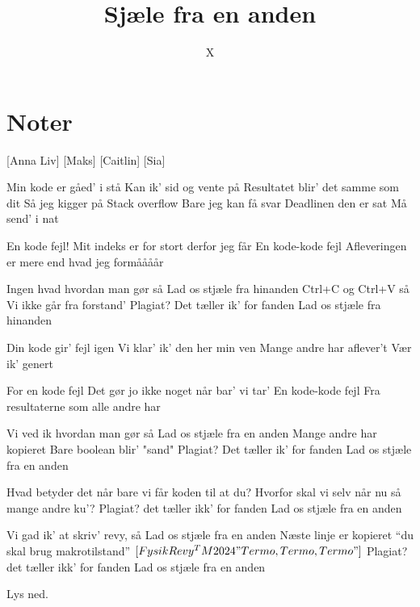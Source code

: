 \documentclass{article}
\title{Sjæle fra en anden}
\author{X}
\begin{document}
                
\maketitle
\section*{Noter}                %
\begin{roles}
[Anna Liv]
[Maks]
[Caitlin]
 [Sia]
\end{roles}

\begin{props}

\prop{} 
\end{props}

\newpage%
\begin{song}

 Min kode er gåed' i stå 
 Kan ik' sid og vente på 
 Resultatet blir' det samme som dit 
 Så jeg kigger på 
 Stack overflow 
 Bare jeg kan få svar 
 Deadlinen den er sat 
Må send' i nat 

 En kode fejl! 
 Mit indeks er for stort derfor jeg får 
 En kode-kode fejl 
 Afleveringen er mere end hvad jeg formåååår 

 Ingen hvad hvordan man gør så 
Lad os stjæle fra hinanden 
Ctrl+C og Ctrl+V så 
Vi ikke går fra forstand' 
Plagiat? Det tæller ik' for fanden 
Lad os stjæle fra hinanden 

 Din kode gir' fejl igen 
 Vi klar' ik' den her min ven 
 Mange andre har aflever't
Vær ik' genert 

 For en kode fejl 
 Det gør jo ikke noget når bar' vi tar' 
 En kode-kode fejl 
 Fra resultaterne som alle andre har 

Vi ved ik hvordan man gør så 
Lad os stjæle fra en anden 
Mange andre har kopieret 
Bare boolean blir' "sand"
Plagiat? Det tæller ik' for fanden 
Lad os stjæle fra en anden

 Hvad betyder det når bare vi får koden til at du?
 Hvorfor skal vi selv når nu så mange andre ku’?
Plagiat? det tæller ikk’ for fanden
Lad os stjæle fra en anden

Vi gad ik’ at skriv’ revy, så
Lad os stjæle fra en anden
Næste linje er kopieret
“du skal brug makrotilstand” $[FysikRevy^TM 2024 "Termo, Termo, Termo"]$
Plagiat? det tæller ikk’ for fanden
Lad os stjæle fra en anden


\scene Lys ned.

\end{song}
\end{document}
